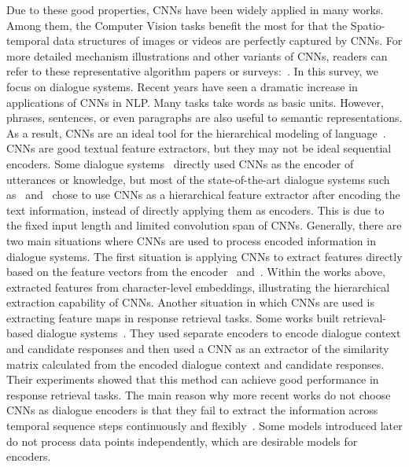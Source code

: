 Due to these good properties, CNNs have been widely applied in many works. Among them, the Computer Vision tasks benefit the most for that the Spatio-temporal data structures of images or videos are perfectly captured by CNNs. For more detailed mechanism illustrations and other variants of CNNs, readers can refer to these representative algorithm papers or surveys:~. In this survey, we focus on dialogue systems.
Recent years have seen a dramatic increase in applications of CNNs in NLP. Many tasks take words as basic units. However, phrases, sentences, or even paragraphs are also useful to semantic representations. As a result, CNNs are an ideal tool for the hierarchical modeling of language~. \\
CNNs are good textual feature extractors, but they may not be ideal sequential encoders. Some dialogue systems~ directly used CNNs as the encoder of utterances or knowledge, but most of the state-of-the-art dialogue systems such as~ and~ chose to use CNNs as a hierarchical feature extractor after encoding the text information, instead of directly applying them as encoders. This is due to the fixed input length and limited convolution span of CNNs. Generally, there are two main situations where CNNs are used to process encoded information in dialogue systems. The first situation is applying CNNs to extract features directly based on the feature vectors from the encoder~ and~. Within the works above,~ extracted features from character-level embeddings, illustrating the hierarchical extraction capability of CNNs. Another situation in which CNNs are used is extracting feature maps in response retrieval tasks. Some works built retrieval-based dialogue systems~. They used separate encoders to encode dialogue context and candidate responses and then used a CNN as an extractor of the similarity matrix calculated from the encoded dialogue context and candidate responses. Their experiments showed that this method can achieve good performance in response retrieval tasks. 
The main reason why more recent works do not choose CNNs as dialogue encoders is that they fail to extract the information across temporal sequence steps continuously and flexibly~. Some models introduced later do not process data points independently, which are desirable models for encoders.

